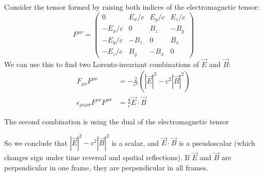 \documentclass[../Main.tex]{subfiles}
\begin{document}
Consider the tensor formed by raising both indices of the electromagnetic tensor:
\begin{equation*}
    F^{\mu \nu} =
    \begin{pmatrix}
        0 & E_x / c & E_y / c & E_z / c \\
        -E_x / c & 0 & B_z & -B_y \\
        -E_y / c & -B_z & 0 & B_x \\
        -E_z / c & B_y & -B_x & 0
    \end{pmatrix}
\end{equation*}
We can use this to find two Lorentz-invariant combinations of $\vec{E}$ and $\vec{B}$:
\begin{align*}
    F_{\mu \nu} F^{\mu \nu} &= -\frac2{c^2} \left(|\vec{E}|^2 - c^2 |\vec{B}|^2\right) \\
    \epsilon_{\mu \nu \rho \sigma} F^{\mu \nu} F^{\rho \sigma} &= \frac8c \vec{E} \cdot \vec{B}
\end{align*}
\begin{remark}
    The second combination is using the dual of the electromagnetic tensor
\end{remark}
So we conclude that $|\vec{E}|^2 - c^2 |\vec{B}|^2$ is a scalar, and $\vec{E} \cdot \vec{B}$ is a pseudoscalar (which changes sign under time reversal and spatial reflections). If $\vec{E}$ and $\vec{B}$ are perpendicular in one frame, they are perpendicular in all frames.
\end{document}

